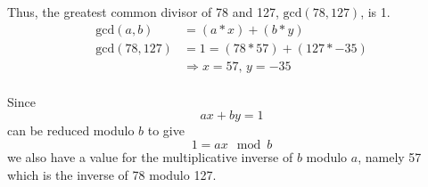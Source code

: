\documentclass[11pt]{article} %
\begin{document}
Thus, the greatest common divisor of 78 and 127, $\text{gcd}(78,127)$, is 1.
\begin{align*}
	\text{gcd}(a,b) &= ( a*x ) + ( b*y ) \\
	\text{gcd}(78,127) &= 1 = ( 78 * 57 ) + ( 127 * -35 ) \\
	&\Rightarrow x=57,\, y=-35 \\
\end{align*}

Since
\begin{equation*}
	ax + by = 1
\end{equation*}
can be reduced modulo $b$ to give
\begin{equation*}
	1 = ax\mod b
\end{equation*}
we also have a value for the multiplicative inverse of $b$ modulo $a$, namely
57 which is the inverse of 78 modulo 127.
\end{document}

